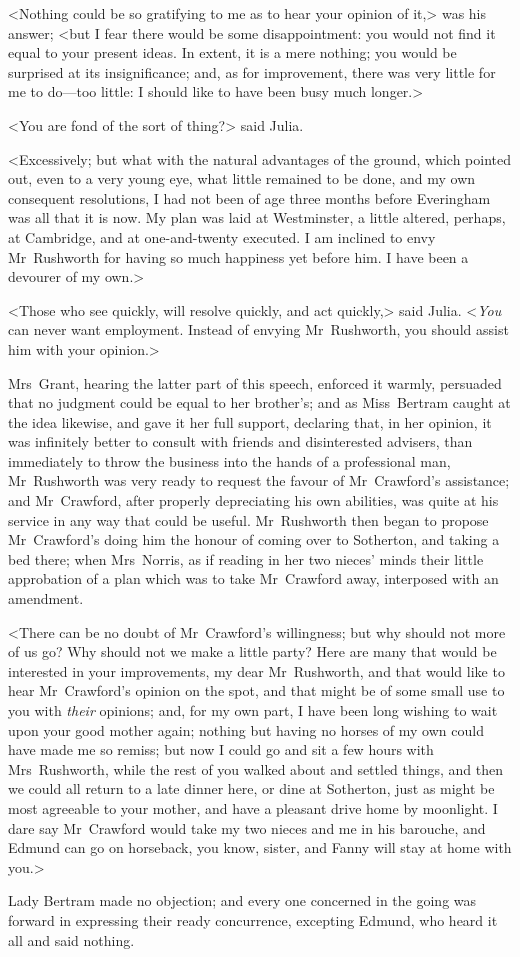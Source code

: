 <Nothing could be so gratifying to me as to hear your opinion of it,> was his answer; <but I fear there would be some disappointment: you would not find it equal to your present ideas. In extent, it is a mere nothing; you would be surprised at its insignificance; and, as for improvement, there was very little for me to do—too little: I should like to have been busy much longer.>

<You are fond of the sort of thing?> said Julia.

<Excessively; but what with the natural advantages of the ground, which pointed out, even to a very young eye, what little remained to be done, and my own consequent resolutions, I had not been of age three months before Everingham was all that it is now. My plan was laid at Westminster, a little altered, perhaps, at Cambridge, and at one-and-twenty executed. I am inclined to envy Mr~Rushworth for having so much happiness yet before him. I have been a devourer of my own.>

<Those who see quickly, will resolve quickly, and act quickly,> said Julia. <\textit{You}  can never want employment. Instead of envying Mr~Rushworth, you should assist him with your opinion.>

Mrs~Grant, hearing the latter part of this speech, enforced it warmly, persuaded that no judgment could be equal to her brother's; and as Miss~Bertram caught at the idea likewise, and gave it her full support, declaring that, in her opinion, it was infinitely better to consult with friends and disinterested advisers, than immediately to throw the business into the hands of a professional man, Mr~Rushworth was very ready to request the favour of Mr~Crawford's assistance; and Mr~Crawford, after properly depreciating his own abilities, was quite at his service in any way that could be useful. Mr~Rushworth then began to propose Mr~Crawford's doing him the honour of coming over to Sotherton, and taking a bed there; when Mrs~Norris, as if reading in her two nieces' minds their little approbation of a plan which was to take Mr~Crawford away, interposed with an amendment.

<There can be no doubt of Mr~Crawford's willingness; but why should not more of us go? Why should not we make a little party? Here are many that would be interested in your improvements, my dear Mr~Rushworth, and that would like to hear Mr~Crawford's opinion on the spot, and that might be of some small use to you with \textit{their}  opinions; and, for my own part, I have been long wishing to wait upon your good mother again; nothing but having no horses of my own could have made me so remiss; but now I could go and sit a few hours with Mrs~Rushworth, while the rest of you walked about and settled things, and then we could all return to a late dinner here, or dine at Sotherton, just as might be most agreeable to your mother, and have a pleasant drive home by moonlight. I dare say Mr~Crawford would take my two nieces and me in his barouche, and Edmund can go on horseback, you know, sister, and Fanny will stay at home with you.>

Lady Bertram made no objection; and every one concerned in the going was forward in expressing their ready concurrence, excepting Edmund, who heard it all and said nothing. 